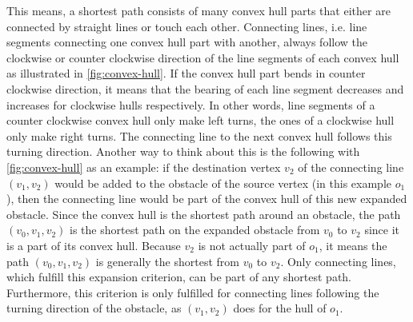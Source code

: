 			This means, a shortest path consists of many convex hull parts that either are connected by straight lines or touch each other.
			Connecting lines, i.e. line segments connecting one convex hull part with another, always follow the clockwise or counter clockwise direction of the line segments of each convex hull as illustrated in \cref{fig:convex-hull}.
			If the convex hull part bends in counter clockwise direction, it means that the bearing of each line segment decreases and increases for clockwise hulls respectively.
			In other words, line segments of a counter clockwise convex hull only make left turns, the ones of a clockwise hull only make right turns.
			The connecting line to the next convex hull follows this turning direction.
			Another way to think about this is the following with \cref{fig:convex-hull} as an example:
			if the destination vertex $v_2$ of the connecting line $(v_1, v_2)$ would be added to the obstacle of the source vertex (in this example $o_1$), then the connecting line would be part of the convex hull of this new expanded obstacle.
			Since the convex hull is the shortest path around an obstacle, the path $(v_0, v_1, v_2)$ is the shortest path on the expanded obstacle from $v_0$ to $v_2$ since it is a part of its convex hull.
			Because $v_2$ is not actually part of $o_1$, it means the path $(v_0, v_1, v_2)$ is generally the shortest from $v_0$ to $v_2$.
			Only connecting lines, which fulfill this expansion criterion, can be part of any shortest path.
			Furthermore, this criterion is only fulfilled for connecting lines following the turning direction of the obstacle, as $(v_1, v_2)$ does for the hull of $o_1$.

